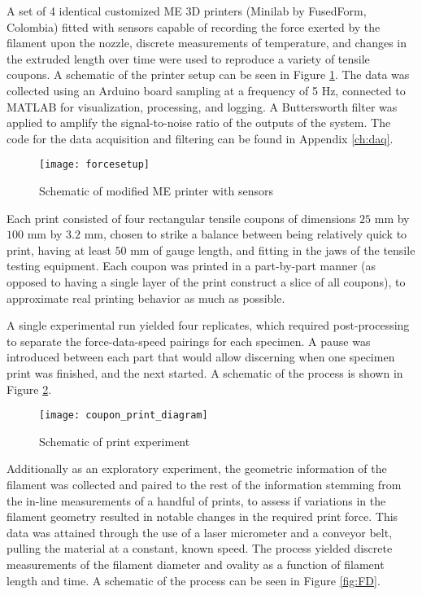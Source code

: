 \documentclass[main.tex]{subfiles}
\begin{document}
A set of 4 identical customized ME 3D printers (Minilab by FusedForm, Colombia) fitted with sensors capable of recording the force exerted by the filament upon the nozzle, discrete measurements of temperature, and changes in the extruded length over time were used to reproduce a variety of tensile coupons. A schematic of the printer setup can be seen in Figure 
\ref{fig:print_setup}. The data was collected using an Arduino board sampling at a frequency of 5 Hz, connected to MATLAB for visualization, processing, and logging. A Buttersworth filter was applied to amplify the signal-to-noise ratio of the outputs of the system. The code for the data acquisition and filtering can be found in Appendix \ref{ch:daq}.

\begin{figure}[!htbp]
	\center
	\texttt{[image: forcesetup]}
	\caption{Schematic of modified ME printer with sensors} \label{fig:print_setup}
\end{figure}

Each print consisted of four rectangular tensile coupons of dimensions $25 \text{ mm}$ by $100 \text{ mm}$ by $3.2 \text{ mm}$, chosen to strike a balance between being relatively quick to print, having at least $50\text{ mm}$ of gauge length, and fitting in the jaws of the tensile testing equipment. Each coupon was printed in a part-by-part manner (as opposed to having a single layer of the print construct a slice of all coupons), to approximate real printing behavior as much as possible. 

A single experimental run yielded four replicates, which required post-processing to separate the force-data-speed pairings for each specimen. A pause was introduced between each part that would allow discerning when one specimen print was finished, and the next started. A schematic of the process is shown in Figure \ref{fig:print_dia}. 


\begin{figure}[!htbp]
	\center
	\texttt{[image: coupon\_print\_diagram]}
	\caption{Schematic of print experiment} \label{fig:print_dia}
\end{figure}

Additionally as an exploratory experiment, the geometric information of the filament was collected and paired to the rest of the information stemming from the in-line measurements of a handful of prints, to assess if variations in the filament geometry resulted in notable changes in the required print force. This data was attained through the use of a laser micrometer and a conveyor belt, pulling the material at a constant, known speed. The process yielded discrete measurements of the filament diameter and ovality as a function of filament length and time. A schematic of the process can be seen in Figure \ref{fig:FD}.  
\end{document}
